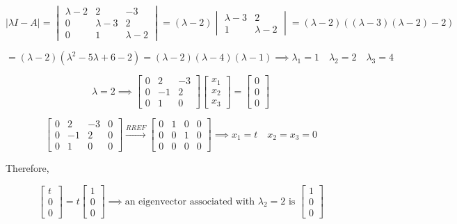 \documentclass{report}
\begin{document}
$$
| \lambda I -  A| = \begin{vmatrix} \lambda - 2 & 2 & -3 \\ 0 & \lambda -3 & 2 \\ 0 & 1 & \lambda - 2 \end{vmatrix} = (\lambda -2 ) \begin{vmatrix} \lambda -3 & 2 \\ 1 & \lambda - 2 \end{vmatrix} = (\lambda - 2)\left( (\lambda - 3)(\lambda -2) - 2\right)
$$

$$
= (\lambda - 2)(\lambda^2 - 5\lambda + 6 -2) = (\lambda-2)(\lambda-4)(\lambda-1) \implies \lambda_1 = 1 \quad \lambda_2 = 2 \quad \lambda_3 = 4
$$

$$
\lambda = 2 \implies \begin{bmatrix} 0 & 2 & -3 \\ 0 & -1 & 2 \\ 0 & 1 & 0 \end{bmatrix}\begin{bmatrix} x_1 \\ x_2 \\ x_3 \end{bmatrix} = \begin{bmatrix} 0 \\ 0 \\ 0 \end{bmatrix}
$$

$$
\begin{bmatrix} 0 & 2 & -3 & 0 \\ 0 & -1 & 2 & 0 \\ 0 & 1 & 0 & 0 \end{bmatrix} \xrightarrow{RREF} \begin{bmatrix} 0 & 1 & 0 & 0 \\ 0 & 0 & 1 & 0 \\ 0 & 0 & 0 & 0 \end{bmatrix} \implies x_1 = t \quad x_2 = x_3 = 0
$$

\noindent Therefore, 

$$
\begin{bmatrix} t \\ 0 \\ 0 \end{bmatrix} = t \begin{bmatrix} 1 \\ 0 \\ 0 \end{bmatrix} \implies \text{an eigenvector associated with } \lambda_2 = 2 \text{ is } \begin{bmatrix} 1 \\ 0 \\ 0 \end{bmatrix}
$$
\end{document}
